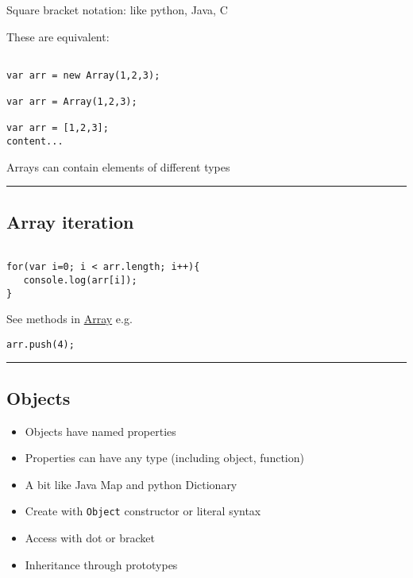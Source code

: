 \documentclass{article}[18pt]
\providecommand{\tightlist}{%
  \setlength{\itemsep}{0pt}\setlength{\parskip}{0pt}}
\begin{document}
Square bracket notation: like python, Java, C

These are equivalent:

\begin{verbatim}

var arr = new Array(1,2,3);

var arr = Array(1,2,3);

var arr = [1,2,3];
content...
\end{verbatim}

Arrays can contain elements of different types

\begin{center}\rule{0.5\linewidth}{\linethickness}\end{center}

\hypertarget{array-iteration}{%
\subsection{Array iteration}\label{array-iteration}}

\begin{verbatim}

for(var i=0; i < arr.length; i++){
   console.log(arr[i]);
}
\end{verbatim}

See methods in
\href{https://developer.mozilla.org/en-US/docs/Web/JavaScript/Reference/Global_Objects/Array}{Array}
e.g.

\begin{verbatim}
arr.push(4);
\end{verbatim}

\begin{center}\rule{0.5\linewidth}{\linethickness}\end{center}

\subsection{Objects}

\begin{itemize}
\tightlist
\item
  Objects have named properties
\item
  Properties can have any type (including object, function)
\item
  A bit like Java Map and python Dictionary
\item
  Create with \texttt{Object} constructor or literal syntax
\item
  Access with dot or bracket
\item
  Inheritance through prototypes
\end{itemize}
\end{document}
